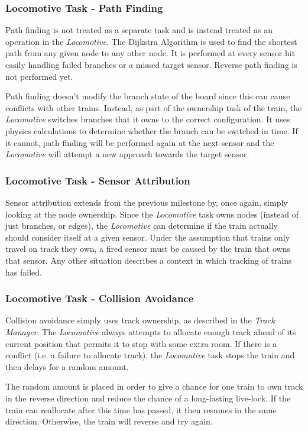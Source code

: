 \documentclass[twoside,a4paper]{refart}
\begin{document}
\subsubsection{Locomotive Task - Path Finding}
Path finding is not treated as a separate task and is instead treated as an operation in the \textit{Locomotive}. The Dijkstra Algorithm is used to find the shortest path from any given node to any other node. It is performed at every sensor hit easily handling failed branches or a missed target sensor. Reverse path finding is not performed yet.

Path finding doesn't modify the branch state of the board since this can cause conflicts with other trains. Instead, as part of the ownership task of the train, the \textit{Locomotive} switches branches that it owns to the correct configuration. It uses physics calculations to determine whether the branch can be switched in time. If it cannot, path finding will be performed again at the next sensor and the \textit{Locomotive} will attempt a new approach towards the target sensor.

\subsubsection{Locomotive Task - Sensor Attribution}
Sensor attribution extends from the previous milestone by, once again, simply looking at the node ownership. Since the \textit{Locomotive} task owns nodes (instead of just branches, or edges), the \textit{Locomotive} can determine if the train actually should consider itself at a given sensor. Under the assumption that trains only travel on track they own, a fired sensor must be caused by the train that owns that sensor. Any other situation describes a context in which tracking of trains has failed.

\subsubsection{Locomotive Task - Collision Avoidance}
Collision avoidance simply uses track ownership, as described in the \textit{Track Manager}. The \textit{Locomotive} always attempts to allocate enough track ahead of its current position that permits it to stop with some extra room. If there is a conflict (i.e. a failure to allocate track), the \textit{Locomotive} task stops the train and then delays for a random amount.

The random amount is placed in order to give a chance for one train to own track in the reverse direction and reduce the chance of a long-lasting live-lock. If the train can reallocate after this time has passed, it then resumes in the same direction. Otherwise, the train will reverse and try again.
\end{document}
